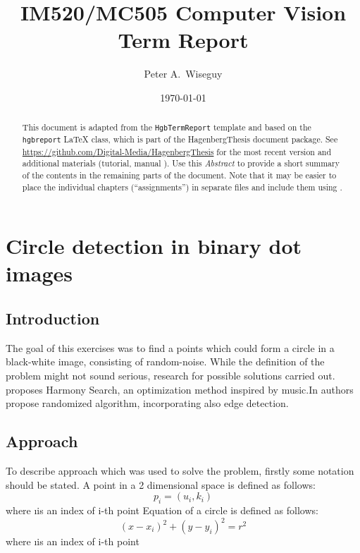 \documentclass[notitlepage,english]{hgbreport}
\author{Peter A.\ Wiseguy}
\title{IM520/MC505 Computer Vision\\ %
			Term Report}
\date{\today}
\begin{document}

\maketitle
\thispagestyle{empty} 

\begin{abstract}\noindent
This document is adapted from the \texttt{HgbTermReport} template and based on the \texttt{hgb\-report} LaTeX class,
which is part of the \textsf{HagenbergThesis} document package.
See \url{https://github.com/Digital-Media/HagenbergThesis} for the most recent version
and additional materials (tutorial, manual \etc).
Use this \emph{Abstract} to provide a short summary of the contents in the remaining parts of the document.
Note that it may be easier to place the individual chapters (``assignments'') in separate files
and include them using \verb!!.
\end{abstract}


\tableofcontents





\chapter{Circle detection in binary dot images}


\section {Introduction}
The goal of this exercises was to find a points which could form a circle in a black-white image, consisting of random-noise. While the definition of the problem might not sound serious, research for possible solutions carried out.\cite{fourie2017robust} proposes Harmony Search, an optimization method inspired by music.In \cite{alomari2013randomized} authors propose randomized algorithm, incorporating also edge detection.


\section {Approach}

To describe approach which was used to solve the problem, firstly some notation should be stated. A point in a 2 dimensional space is defined as follows:
\[p_{i}=(u_{i},k_{i})\]
where \i is an index of i-th point
Equation of a circle is defined as follows:
\[(x-x_{i})^2+(y-y_{i})^2=r^2\]
where \i is an index of i-th point
\end{document}
